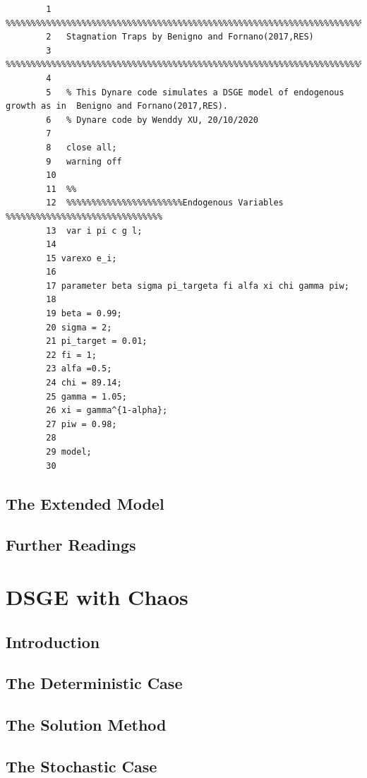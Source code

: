 \documentclass[10pt,math=newtx,citestyle=gb7714-2015,bibstyle=gb7714-2015]{elegantbook}
\begin{document}
{{{	\begin{lstlisting}
		1	%%%%%%%%%%%%%%%%%%%%%%%%%%%%%%%%%%%%%%%%%%%%%%%%%%%%%%%%%%%%%%%%%%%%%%%%%%%
		2	Stagnation Traps by Benigno and Fornano(2017,RES)
		3	%%%%%%%%%%%%%%%%%%%%%%%%%%%%%%%%%%%%%%%%%%%%%%%%%%%%%%%%%%%%%%%%%%%%%%%%%%%
		4	
		5	% This Dynare code simulates a DSGE model of endogenous growth as in  Benigno and Fornano(2017,RES).
		6	% Dynare code by Wenddy XU, 20/10/2020
		7	
		8	close all;
		9	warning off
		10	
		11	%%
		12	%%%%%%%%%%%%%%%%%%%%%%%Endogenous Variables %%%%%%%%%%%%%%%%%%%%%%%%%%%%%%%
		13	var i pi c g l;
		14
		15 varexo e_i;
		16
		17 parameter beta sigma pi_targeta fi alfa xi chi gamma piw;
		18
		19 beta = 0.99;
		20 sigma = 2;
		21 pi_target = 0.01;
		22 fi = 1;
		23 alfa =0.5;
		24 chi = 89.14;
		25 gamma = 1.05;
		26 xi = gamma^{1-alpha};
		27 piw = 0.98;
		28
		29 model;
		30  
	\end{lstlisting}
	
	
	\section{The Extended Model}
	
	
	
	
	
	\section{Further Readings}
	
    
    
    
    \chapter{DSGE with Chaos}	
	
	\section{Introduction}
	
	\section{The Deterministic Case}
	
	
	\section{The Solution Method}
	
	
	
	\section{The Stochastic Case}
	
}}}
\end{document}
